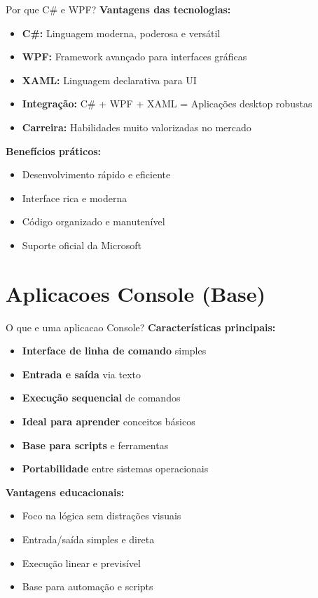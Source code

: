 \documentclass[aspectratio=169]{beamer}
\begin{document}
\begin{frame}{Por que C\# e WPF?}
\textbf{Vantagens das tecnologias:}
\begin{itemize}
    \item \textbf{C\#:} Linguagem moderna, poderosa e versátil
    \item \textbf{WPF:} Framework avançado para interfaces gráficas
    \item \textbf{XAML:} Linguagem declarativa para UI
    \item \textbf{Integração:} C\# + WPF + XAML = Aplicações desktop robustas
    \item \textbf{Carreira:} Habilidades muito valorizadas no mercado
\end{itemize}

\textbf{Benefícios práticos:}
\begin{itemize}
    \item Desenvolvimento rápido e eficiente
    \item Interface rica e moderna
    \item Código organizado e manutenível
    \item Suporte oficial da Microsoft
\end{itemize}
\end{frame}

\section{Aplicacoes Console (Base)}

\begin{frame}{O que e uma aplicacao Console?}
\textbf{Características principais:}
\begin{itemize}
    \item \textbf{Interface de linha de comando} simples
    \item \textbf{Entrada e saída} via texto
    \item \textbf{Execução sequencial} de comandos
    \item \textbf{Ideal para aprender} conceitos básicos
    \item \textbf{Base para scripts} e ferramentas
    \item \textbf{Portabilidade} entre sistemas operacionais
\end{itemize}

\textbf{Vantagens educacionais:}
\begin{itemize}
    \item Foco na lógica sem distrações visuais
    \item Entrada/saída simples e direta
    \item Execução linear e previsível
    \item Base para automação e scripts
\end{itemize}
\end{frame}
\end{document}
